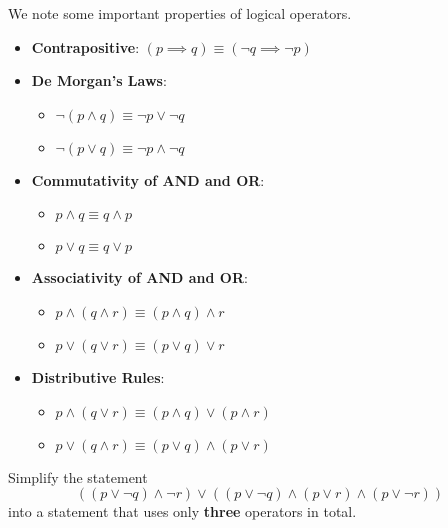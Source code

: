 We note some important properties of logical operators.
\begin{itemize}
    \item \textbf{Contrapositive}: $(p \implies q) \equiv (\lnot q \implies \lnot p)$
    \item \textbf{De Morgan's Laws}: \begin{itemize}
        \item $\lnot (p \land q) \equiv \lnot p \lor \lnot q$
        \item $\lnot (p \lor q) \equiv \lnot p \land \lnot q$
    \end{itemize}
    \item \textbf{Commutativity of AND and OR}: \begin{itemize}
        \item $p \land q \equiv q \land p$
        \item $p \lor q \equiv q \lor p$
    \end{itemize}
    \item \textbf{Associativity of AND and OR}: \begin{itemize}
        \item $p \land (q \land r) \equiv (p \land q) \land r$
        \item $p \lor (q \lor r) \equiv (p \lor q) \lor r$
    \end{itemize}
    \item \textbf{Distributive Rules}: \begin{itemize}
        \item $p \land (q \lor r) \equiv (p \land q) \lor (p \land r)$
        \item $p \lor (q \land r) \equiv (p \lor q) \land (p \lor r)$
    \end{itemize}
\end{itemize}
\begin{exercise}
    Simplify the statement
    \[
        ((p \lor \lnot q) \land \lnot r) \lor ((p \lor \lnot q) \land (p \lor r) \land (p \lor \lnot r))
    \]
    into a statement that uses only \textbf{three} operators in total.
\end{exercise}

